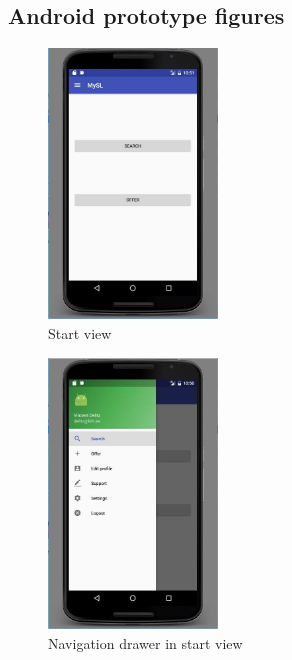 \documentclass[11pt,twoside,a4paper]{report}
\begin{document}
\begin{appendices}
\chapter{Android prototype figures}
\label{appendix:android-prototype-figures}
\newpage

\begin{figure}
	\centering
	\includegraphics[width=0.4\textwidth]{jpg/android-start.jpg}
	\caption{Start view}
	\label{figure:start-view}
\end{figure}

\begin{figure}
	\centering
	\includegraphics[width=0.4\textwidth]{jpg/android-navigation-drawer.jpg}
	\caption{Navigation drawer in start view}
	\label{figure:navigation-drawer-in-start-view}
\end{figure}


\end{appendices}
\end{document}
